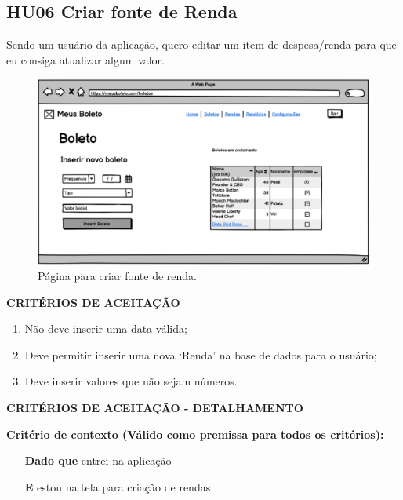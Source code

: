 \subsection{HU06 Criar fonte de Renda}

Sendo um usuário da aplicação, quero editar um item de despesa/renda para que eu consiga atualizar algum valor.

\begin{figure}[htb]
	\caption{\label{fig:hu06}Página para criar fonte de renda.}
	\begin{center}
		\includegraphics[scale=0.5]{images/CriarBoletoRenda.png}
	\end{center}
\end{figure}

\textbf{CRITÉRIOS DE ACEITAÇÃO}

\begin{enumerate}
    \item Não deve inserir uma data válida;
    \item Deve permitir inserir uma nova ‘Renda’ na base de dados para o
usuário;
    \item Deve inserir valores que não sejam números.
\end{enumerate}

\textbf{CRITÉRIOS DE ACEITAÇÃO - DETALHAMENTO}

\textbf{Critério de contexto (Válido como premissa para todos os critérios):}

\begin{itemize}
    \item[\textbf{Dado que}] entrei na aplicação
    \item[\textbf{E}] estou na tela para criação de rendas
\end{itemize}



